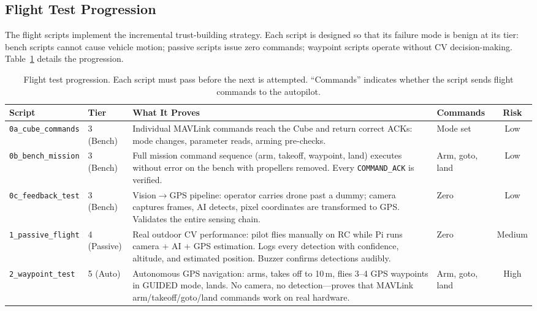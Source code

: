 \subsection{Flight Test Progression}\label{sec:flight-progression}

The flight scripts implement the incremental trust-building strategy.  Each script is designed so that its failure mode is benign at its tier: bench scripts cannot cause vehicle motion; passive scripts issue zero commands; waypoint scripts operate without CV decision-making.  Table~\ref{tab:flight-scripts} details the progression.

\begin{table}[H]
\centering
\caption{Flight test progression.  Each script must pass before the next is attempted.  ``Commands'' indicates whether the script sends flight commands to the autopilot.}
\label{tab:flight-scripts}
\small
\begin{tabular}{@{}llp{5.8cm}lc@{}}
\toprule
\textbf{Script} & \textbf{Tier} & \textbf{What It Proves} & \textbf{Commands} & \textbf{Risk} \\
\midrule
\texttt{0a\_cube\_commands} & 3 (Bench) & Individual MAVLink commands reach the Cube and return correct ACKs: mode changes, parameter reads, arming pre-checks. & Mode set & Low \\
\addlinespace
\texttt{0b\_bench\_mission} & 3 (Bench) & Full mission command sequence (arm, takeoff, waypoint, land) executes without error on the bench with propellers removed.  Every \texttt{COMMAND\_ACK} is verified. & Arm, goto, land & Low \\
\addlinespace
\texttt{0c\_feedback\_test} & 3 (Bench) & Vision$\to$GPS pipeline: operator carries drone past a dummy; camera captures frames, AI detects, pixel coordinates are transformed to GPS.  Validates the entire sensing chain. & Zero & Low \\
\addlinespace
\texttt{1\_passive\_flight} & 4 (Passive) & Real outdoor CV performance: pilot flies manually on RC while Pi runs camera + AI + GPS estimation.  Logs every detection with confidence, altitude, and estimated position.  Buzzer confirms detections audibly. & Zero & Medium \\
\addlinespace
\texttt{2\_waypoint\_test} & 5 (Auto) & Autonomous GPS navigation: arms, takes off to 10\,m, flies 3--4 GPS waypoints in GUIDED mode, lands.  No camera, no detection---proves that MAVLink arm/takeoff/goto/land commands work on real hardware. & Arm, goto, land & High \\

\end{tabular}
\end{table}
